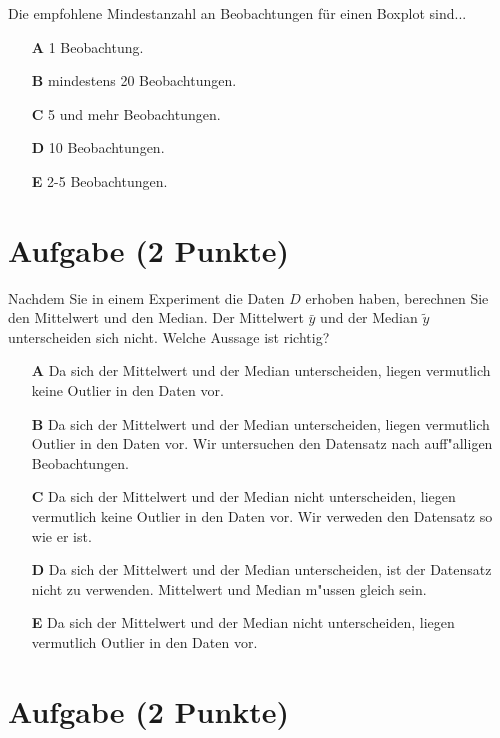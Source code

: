 \documentclass[a4paper, 10pt]{scrartcl}\usepackage[]{graphicx}\usepackage[]{xcolor}
\begin{document}
Die empfohlene Mindestanzahl an Beobachtungen f{\"u}r einen Boxplot sind...



\begin{enumerate}
\item [\textbf{A} \msquare] 1 Beobachtung.
\item [\textbf{B} \msquare] mindestens 20 Beobachtungen.
\item [\textbf{C} \msquare] 5 und mehr Beobachtungen.
\item [\textbf{D} \msquare] 10 Beobachtungen.
\item [\textbf{E} \msquare] 2-5 Beobachtungen.
\end{enumerate} 

\section{Aufgabe \hfill (2 Punkte)}



Nachdem Sie in einem Experiment die Daten $D$ erhoben haben, berechnen Sie den
Mittelwert und den Median. Der Mittelwert $\bar{y}$ und der Median
$\tilde{y}$ unterscheiden sich nicht. Welche Aussage ist richtig?




\begin{enumerate}
\item [\textbf{A} \msquare] Da sich der Mittelwert und der Median unterscheiden, liegen vermutlich keine Outlier in den Daten vor.
\item [\textbf{B} \msquare] Da sich der Mittelwert und der Median unterscheiden, liegen vermutlich Outlier in den Daten vor. Wir untersuchen den Datensatz nach auff{"a}lligen Beobachtungen.
\item [\textbf{C} \msquare] Da sich der Mittelwert und der Median nicht unterscheiden, liegen vermutlich keine Outlier in den Daten vor. Wir verweden den Datensatz so wie er ist.
\item [\textbf{D} \msquare] Da sich der Mittelwert und der Median unterscheiden, ist der Datensatz nicht zu verwenden. Mittelwert und Median m{"u}ssen gleich sein.
\item [\textbf{E} \msquare] Da sich der Mittelwert und der Median nicht unterscheiden, liegen vermutlich Outlier in den Daten vor.
\end{enumerate} 

\section{Aufgabe \hfill (2 Punkte)}
\end{document}
